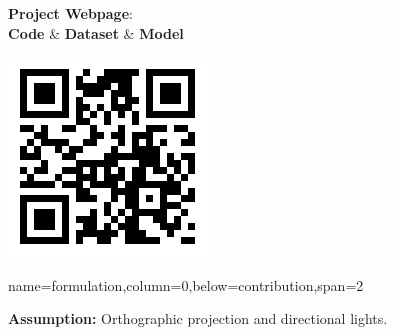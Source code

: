 \documentclass[a0paper,landscape]{baposter}
\begin{document}
\begin{poster}
{\begin{minipage}[t]{0.4\textwidth}
            \begin{center}
            \begin{minipage}{0.56\linewidth}
                \begin{center}
                \textbf{Project Webpage}: \\
                \vspace{0.5em}\textbf{Code} \& \textbf{Dataset} \& \textbf{Model}
                \end{center}
            \end{minipage}
            \begin{minipage}{0.24\linewidth}
                \begin{center}
                    \includegraphics[width=\linewidth]{images/PS-FCN_QRCode.png}
                \end{center}
            \end{minipage}
            \end{center}
        \end{minipage}
    }

    {name=formulation,column=0,below=contribution,span=2}
    {
        \textbf{\color{blue}Assumption:} Orthographic projection and directional lights.
        
}
\end{poster}
\end{document}
